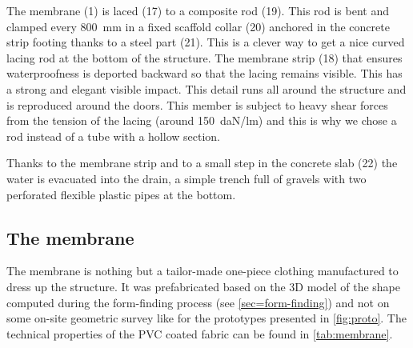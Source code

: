 The membrane (1) is laced (17) to a composite rod (19). This rod is bent and clamped every \SI{800}{mm} in a fixed scaffold collar (20) anchored in the concrete strip footing thanks to a steel part (21). This is a clever way to get a nice curved lacing rod at the bottom of the structure. The membrane strip (18) that ensures waterproofness is deported backward so that the lacing remains visible. This has a strong and elegant visible impact. This detail runs all around the structure and is reproduced around the doors. This member is subject to heavy shear forces from the tension of the lacing (around \SI{150}{daN/lm}) and this is why we chose a rod instead of a tube with a hollow section.

Thanks to the membrane strip and to a small step in the concrete slab (22) the water is evacuated into the drain, a simple trench full of gravels with two perforated flexible plastic pipes at the bottom.


\subsection{The membrane}
The membrane is nothing but a tailor-made one-piece clothing manufactured to dress up the structure. It was prefabricated based on the 3D model of the shape computed during the form-finding process (see \cref{sec=form-finding}) and not on some on-site geometric survey like for the prototypes presented in \cref{fig:proto}. The technical properties of the PVC coated fabric can be found in \cref{tab:membrane}.

